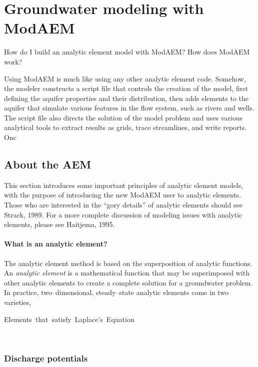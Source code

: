 \chapter{Groundwater modeling with ModAEM\label{cha:modeling-with-modaem}}

How do I build an analytic element model with ModAEM? How does ModAEM
work? 

Using ModAEM is much like using any other analytic element code. Somehow,
the modeler constructs a script file that controls the creation of
the model, first defining the aquifer properties and their distribution,
then adds elements to the aquifer that simulate various features in
the flow system, such as rivers and wells. The script file also directs
the solution of the model problem and uses various analytical tools
to extract results as grids, trace streamlines, and write reports.
Onc


\section{About the AEM}

This section introduces some important principles of analytic element
models, with the purpose of introducing the new ModAEM user to analytic
elements. Those who are interested in the ``gory details'' of analytic
elements should see Strack, 1989. For a more complete discussion of
modeling issues with analytic elements, please see Haitjema, 1995.


\subsubsection{What is an analytic element?}

The analytic element method is based on the superposition of analytic
functions. An \emph{analytic element} is a mathematical function that
may be superimposed with other analytic elements to create a complete
solution for a groundwater problem. In practice, two--dimensional,
steady--state analytic elements come in two varieties,
\begin{description}
\item [{Elements~that~satisfy~Laplace's~Equation}]~
\end{description}

\subsection{Discharge potentials }


